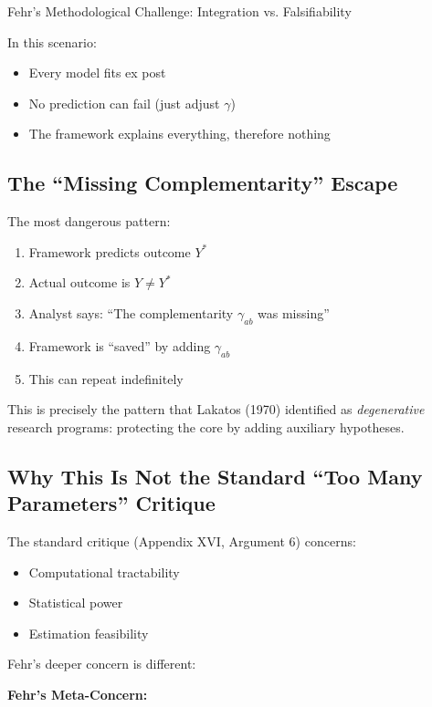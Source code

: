 \begin{chapter}{Fehr's Methodological Challenge: Integration vs. Falsifiability}
\begin{tcolorbox}[colback=red!10!white,colframe=red!75!black,title=\textbf{Fehr's Nightmare}]
In this scenario:
\begin{itemize}[noitemsep]
    \item Every model fits ex post
    \item No prediction can fail (just adjust $\gamma$)
    \item The framework explains everything, therefore nothing
\end{itemize}
\end{tcolorbox}

\subsection{The ``Missing Complementarity'' Escape}

The most dangerous pattern:

\begin{enumerate}
    \item Framework predicts outcome $Y^*$
    \item Actual outcome is $Y \neq Y^*$
    \item Analyst says: ``The complementarity $\gamma_{ab}$ was missing''
    \item Framework is ``saved'' by adding $\gamma_{ab}$
    \item This can repeat indefinitely
\end{enumerate}

This is precisely the pattern that Lakatos (1970) identified as \textit{degenerative} research programs: protecting the core by adding auxiliary hypotheses.

\subsection{Why This Is Not the Standard ``Too Many Parameters'' Critique}

The standard critique (Appendix XVI, Argument 6) concerns:
\begin{itemize}[noitemsep]
    \item Computational tractability
    \item Statistical power
    \item Estimation feasibility
\end{itemize}

Fehr's deeper concern is different:

\begin{tcolorbox}[colback=gray!10!white,colframe=gray!75!black]
\textbf{Fehr's Meta-Concern:}


\end{tcolorbox}
\end{chapter}
